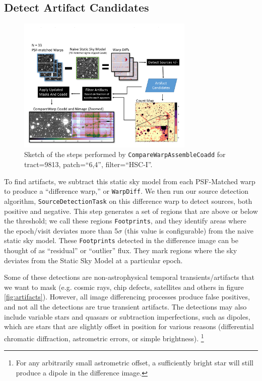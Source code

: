 \documentclass[DM,authoryear,toc]{lsstdoc}
\begin{document}
\subsection{Detect Artifact Candidates}
\label{sec:detect}

\begin{figure}
\begin{centering}
\includegraphics[width=0.75\textwidth]{figures/CompareWarpDemo.pdf}
\par\end{centering}
\caption{\label{fig:demo} Sketch of the steps performed by \texttt{CompareWarpAssembleCoadd} for tract=9813, patch=``6,4'', filter=``HSC-I''.}
\end{figure}

To find artifacts, we subtract this static sky model from each PSF-Matched warp to produce a ``difference warp,'' or \texttt{WarpDiff}.
We then run our source detection algorithm, \texttt{SourceDetectionTask} on this difference warp to detect sources, both positive and negative.
This step generates a set of regions that are above or below the threshold; we call these regions \texttt{Footprints}, and they identify areas where the epoch/visit deviates more than 5$\sigma$ (this value is configurable) from the naive static sky model.
These \texttt{Footprints} detected in the difference image can be thought of as ``residual'' or ``outlier'' flux.
They mark regions where the sky deviates from the Static Sky Model at a particular epoch.

Some of these detections are non-astrophysical temporal transients/artifacts that we want to mask (e.g. cosmic rays, chip defects, satellites and others in figure \ref{fig:artifacts}).
However, all image differencing processes produce false positives, and not all the detections are true transient artifacts.
The detections may also include variable stars and quasars or subtraction imperfections, such as dipoles, which are stars that are slightly offset in position for various reasons (differential chromatic diffraction, astrometric errors, or simple brightness).
\footnote{For any arbitrarily small astrometric offset, a sufficiently bright star will still produce a dipole in the difference image.}
\end{document}
